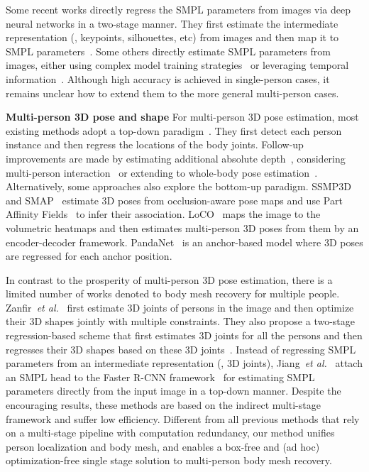 \documentclass[final]{cvpr}
\newcommand{\et}{\emph{et al.}}
\newcommand{\myparagraph}[1]{{ \noindent \bf #1}}
\begin{document}
Some recent works directly regress the SMPL parameters from images via deep neural networks in a two-stage manner. 
They first estimate the intermediate representation (\eg, keypoints, silhouettes, etc) from images and then map it to SMPL parameters~\cite{pavlakos2018learning,omran2018neural,tung2017self,kolotouros2019convolutional}. 
Some others directly estimate SMPL parameters from images, either using complex model training strategies~\cite{hmrKanazawa17,guler2019holopose} or leveraging temporal information~\cite{arnab2019exploiting,kocabas2020vibe}.
Although high accuracy is achieved in single-person cases,  it remains unclear how to extend them to the more general multi-person cases.


\myparagraph{Multi-person 3D pose and shape}
For multi-person 3D pose estimation, most existing methods adopt a top-down paradigm~\cite{rogez2017lcr,dabral2018learning,rogez2019lcr}.
They first detect each person instance and then  regress the locations of the body joints.
Follow-up improvements are made by estimating additional absolute depth~\cite{moon2019camera}, considering multi-person interaction~\cite{guo2020pi,li2020hmor} or extending to whole-body pose estimation~\cite{weinzaepfel2020dope}.
Alternatively, some approaches also explore the bottom-up paradigm. 
SSMP3D~\cite{mehta2018single} and SMAP~\cite{zhen2020smap} estimate 3D poses from occlusion-aware pose maps and use Part Affinity Fields~\cite{cao2017realtime} to infer their association.
LoCO~\cite{fabbri2020compressed} maps the image to the volumetric heatmaps and then estimates multi-person 3D poses from them by an encoder-decoder framework.
PandaNet~\cite{benzine2020pandanet} is an anchor-based model where 3D poses are regressed for each anchor position.


In contrast to the prosperity of multi-person 3D pose estimation, there is a limited number of works denoted to  body mesh recovery for multiple people.
Zanfir~\et~\cite{zanfir2018monocular} first estimate 3D joints of persons in the image and then optimize their 3D shapes jointly with multiple constraints.
They also propose a two-stage regression-based scheme that first estimates 3D joints for all the persons and then regresses their 3D shapes based on these 3D joints~\cite{zanfir2018deep}.
Instead of regressing SMPL parameters from an intermediate representation (\eg, 3D joints), Jiang~\et~\cite{jiang2020coherent} attach an SMPL head to the Faster R-CNN framework~\cite{ren2015faster} for estimating SMPL parameters directly from the input image in a top-down manner.
Despite the encouraging results, these methods are based on the indirect multi-stage framework and  suffer low efficiency. 
Different from all previous methods that rely on a multi-stage pipeline with computation redundancy, our method unifies person localization and body mesh, and enables a box-free and (ad hoc) optimization-free single stage solution to multi-person body mesh recovery. 
\end{document}
